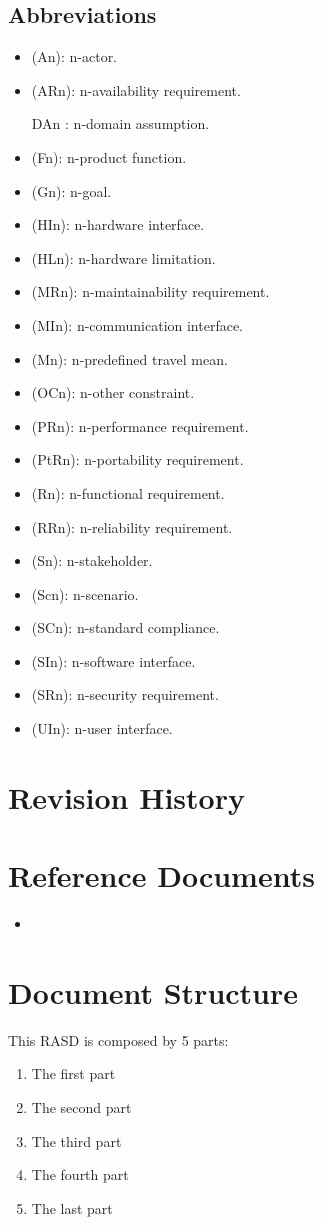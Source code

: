 \documentclass[a4paper,leqno]{book}
\begin{document}
\subsection{Abbreviations}
\begin{itemize}
	\item (An): n-actor.
	\item (ARn): n-availability requirement.
	\item [DAn]: n-domain assumption.
	\item (Fn): n-product function.	
	\item (Gn): n-goal.
	\item (HIn): n-hardware interface.
	\item (HLn): n-hardware limitation.
	\item (MRn): n-maintainability requirement.
	\item (MIn): n-communication interface.
	\item (Mn): n-predefined travel mean.
	\item (OCn):
n-other constraint.
	\item (PRn):
n-performance requirement.
	\item (PtRn): n-portability requirement.
	\item (Rn): n-functional requirement.
	\item (RRn): n-reliability requirement.
	\item (Sn): n-stakeholder.
	\item (Scn): n-scenario.
	\item (SCn): n-standard compliance.
	\item (SIn): n-software interface.
	\item (SRn): n-security requirement.
	\item (UIn): n-user interface.
	
\end{itemize}

\section{Revision History}

\section{Reference Documents}
\begin{itemize}
	\item 
\end{itemize}

\section{Document Structure}
This RASD is composed by 5 parts:
\begin{enumerate}
	\item The first part
	\item The second part
	\item The third part
	\item  The fourth part
	\item  The last part
\end{enumerate}
\end{document}
